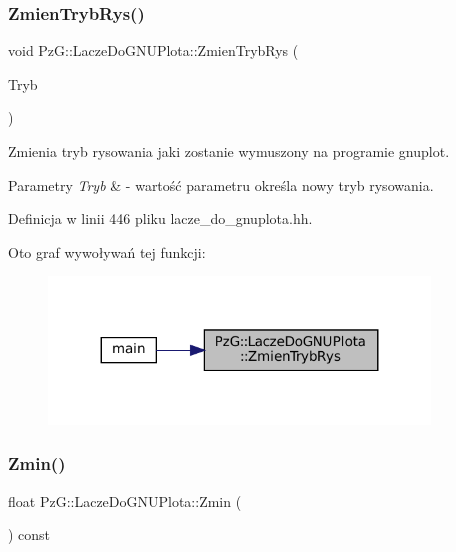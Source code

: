 \subsubsection{\texorpdfstring{ZmienTrybRys()}{ZmienTrybRys()}}
{\footnotesize\ttfamily void Pz\+G\+::\+Lacze\+Do\+G\+N\+U\+Plota\+::\+Zmien\+Tryb\+Rys (\begin{DoxyParamCaption}\item[{\mbox{\hyperlink{namespace_pz_g_aeedae1ef10c66d720f9e89de408ca4ca}{Tryb\+Rysowania}}}]{Tryb }\end{DoxyParamCaption})\hspace{0.3cm}{\ttfamily [inline]}}

Zmienia tryb rysowania jaki zostanie wymuszony na programie {\ttfamily gnuplot}. 
\begin{DoxyParams}{Parametry}
{\em Tryb} & -\/ wartość parametru określa nowy tryb rysowania. \\
\hline
\end{DoxyParams}


Definicja w linii 446 pliku lacze\+\_\+do\+\_\+gnuplota.\+hh.

Oto graf wywoływań tej funkcji\+:\nopagebreak
\begin{figure}[H]
\begin{center}
\leavevmode
\includegraphics[width=287pt]{class_pz_g_1_1_lacze_do_g_n_u_plota_a10950349b348fd3a3d4143e95337527c_icgraph}
\end{center}
\end{figure}
\mbox{\label{class_pz_g_1_1_lacze_do_g_n_u_plota_a9068bd9a9873ba9c6d70016f1ae7cd7f}} 
\subsubsection{\texorpdfstring{Zmin()}{Zmin()}}
{\footnotesize\ttfamily float Pz\+G\+::\+Lacze\+Do\+G\+N\+U\+Plota\+::\+Zmin (\begin{DoxyParamCaption}{ }\end{DoxyParamCaption}) const\hspace{0.3cm}{\ttfamily [inline]}}

